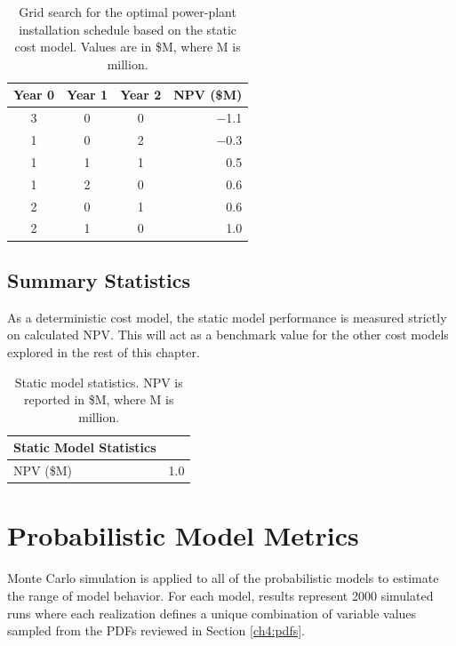 \begin{table}[!htp]%
\centering
\begin{tabular}{|c|c|c|r|}
\hline
\textbf{Year 0} & \textbf{Year 1} & \textbf{Year 2} & \textbf{NPV (\$M)} \\ \hline
3 & 0 & 0 & $\boldsymbol-$1.1 \\ \hline
1 & 0 & 2 & $\boldsymbol-$0.3 \\ \hline
1 & 1 & 1 & 0.5 \\ \hline
1 & 2 & 0 & 0.6 \\ \hline
2 & 0 & 1 & 0.6 \\ \hline
2 & 1 & 0 & 1.0 \\ \hline
\end{tabular}
\caption[Static model module installation schedule]{Grid search for the optimal power-plant installation schedule based on the static cost model. Values are in \$M, where M is million.}
\label{tab:static_optimization}
\end{table}

\subsection{Summary Statistics}\label{ch6:static_stats}

As a deterministic cost model, the static model performance is measured strictly on calculated NPV. This will act as a benchmark value for the other cost models explored in the rest of this chapter.

\begin{table}[H]
\centering
\begin{tabular}{|l|c|}
\hline
\textbf{Static Model Statistics} &  \\ \hline
NPV (\$M) & 1.0 \\ \hline
\end{tabular}
\caption[Static model statistics]{Static model statistics. NPV is reported in \$M, where M is million.}
\label{tab:static_mod_stats}
\end{table}

\section{Probabilistic Model Metrics}\label{ch6:cost_model_metrics}

Monte Carlo simulation is applied to all of the probabilistic models to estimate the range of model behavior. For each model, results represent 2000 simulated runs where each realization defines a unique combination of variable values sampled from the PDFs reviewed in Section \ref{ch4:pdfs}. 

